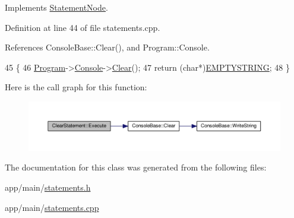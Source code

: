 Implements \hyperlink{classStatementNode_a721589622c930c010927b9a9c55b173e}{Statement\+Node}.



Definition at line 44 of file statements.\+cpp.



References Console\+Base\+::\+Clear(), and Program\+::\+Console.


\begin{DoxyCode}
45 \{
46     \hyperlink{classProgram}{Program}->\hyperlink{classProgram_a7edba60e839230f20ce29716567bc892}{Console}->\hyperlink{classConsoleBase_a2f5aa6f61f903a098c315640e64815c6}{Clear}();
47     \textcolor{keywordflow}{return} (\textcolor{keywordtype}{char}*)\hyperlink{platform_8h_a79ff1b9ff232b38c8b5600659e6bc7c2}{EMPTYSTRING};
48 \}
\end{DoxyCode}


Here is the call graph for this function\+:
\nopagebreak
\begin{figure}[H]
\begin{center}
\leavevmode
\includegraphics[width=350pt]{df/d28/classClearStatement_ad01255515180fd5271c491386df560a8_cgraph}
\end{center}
\end{figure}




The documentation for this class was generated from the following files\+:\begin{DoxyCompactItemize}
\item 
app/main/\hyperlink{statements_8h}{statements.\+h}\item 
app/main/\hyperlink{statements_8cpp}{statements.\+cpp}\end{DoxyCompactItemize}

